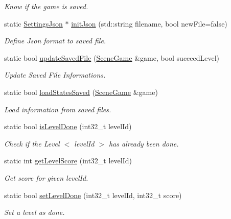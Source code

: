 \begin{DoxyCompactItemize}
\begin{DoxyCompactList}\small\item\em Know if the game is saved. \end{DoxyCompactList}\item 
static \hyperlink{class_settings_json}{Settings\+Json} $\ast$ \hyperlink{class_save_ab3878ea5a5b26b5d1829a98a38d78ffa}{init\+Json} (std\+::string filename, bool new\+File=false)
\begin{DoxyCompactList}\small\item\em Define Json format to saved file. \end{DoxyCompactList}\item 
static bool \hyperlink{class_save_a858a98bf0dd78395f5f7bee7bbdc7f57}{update\+Saved\+File} (\hyperlink{class_scene_game}{Scene\+Game} \&game, bool succeed\+Level)
\begin{DoxyCompactList}\small\item\em Update Saved File Informations. \end{DoxyCompactList}\item 
static bool \hyperlink{class_save_aa9264e3e576763299af4df148700e266}{load\+States\+Saved} (\hyperlink{class_scene_game}{Scene\+Game} \&game)
\begin{DoxyCompactList}\small\item\em Load information from saved files. \end{DoxyCompactList}\item 
static bool \hyperlink{class_save_a75601bb68eba4ed487d5176acf6f51e9}{is\+Level\+Done} (int32\+\_\+t level\+Id)
\begin{DoxyCompactList}\small\item\em Check if the Level $<$ level\+Id $>$ has already been done. \end{DoxyCompactList}\item 
static int \hyperlink{class_save_a802b6d258310bab2945abd9653360fe5}{get\+Level\+Score} (int32\+\_\+t level\+Id)
\begin{DoxyCompactList}\small\item\em Get score for given level\+Id. \end{DoxyCompactList}\item 
static bool \hyperlink{class_save_a6423aab69350aaafaad752830e191840}{set\+Level\+Done} (int32\+\_\+t level\+Id, int32\+\_\+t score)
\begin{DoxyCompactList}\small\item\em Set a level as done. \end{DoxyCompactList}\item 

\end{DoxyCompactItemize}
